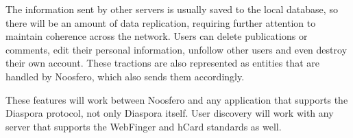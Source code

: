 The information sent by other servers is usually saved to the local database, so
there will be an amount of data replication, requiring further attention to maintain
coherence across the network. Users can delete publications or comments, edit their
personal information, unfollow other users and even destroy their own account. These
tractions are also represented as entities that are handled by Noosfero, which also
sends them accordingly.

These features will work between Noosfero and any application that
supports the Diaspora protocol, not only Diaspora itself. User discovery
will work with any server that supports the WebFinger and hCard
standards as well.
